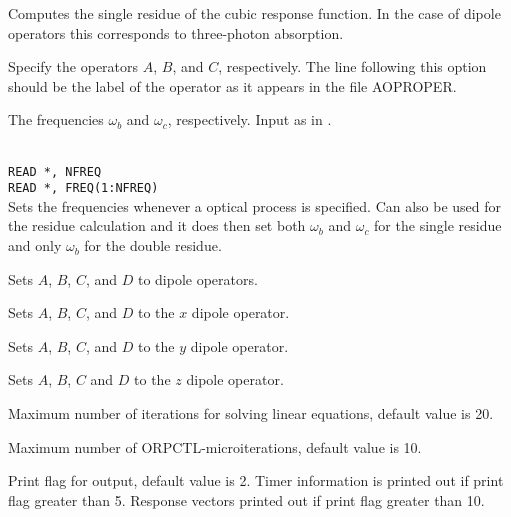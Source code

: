 \begin{description}

\item{}
Computes the single residue of the cubic
response function.
In the case of dipole operators this corresponds to
three-photon absorption.

\item[\Key{APROP}, \Key{BPROP}, \Key{CPROP}]
Specify the operators $A$, $B$, and $C$, respectively.
The line following this
option should be the label of the operator as it appears in the file
AOPROPER.

\item[\Key{BFREQ}, \Key{CFREQ}]
The frequencies
$\omega_b$ and $\omega_c$, respectively. Input as in
.

\item{}\\
\verb|READ *, NFREQ|\\
\verb|READ *, FREQ(1:NFREQ)|\\
Sets the frequencies whenever a optical process is specified.
Can also be used for the residue calculation and it does then set 
both $\omega_b$ and $\omega_c$ for the single residue and only
$\omega_b$ for the double residue.

\item{}
Sets $A$, $B$, $C$, and $D$ to dipole operators.

\item{}
Sets $A$, $B$, $C$, and $D$ to the $x$ dipole operator.

\item{}
Sets $A$, $B$, $C$, and $D$ to the $y$ dipole operator.

\item{}
Sets $A$, $B$, $C$ and $D$ to the $z$ dipole operator.

\item{}
Maximum number of iterations for solving linear equations, default value is 20.

\item{}
Maximum number of ORPCTL-microiterations, default value is 10.

\item{}
Print flag for output, default value is 2. Timer information is printed
out if print flag greater than 5. Response vectors printed out if
print flag greater than 10.


\end{description}
